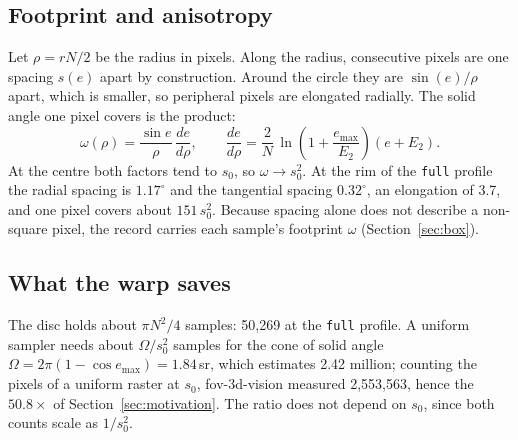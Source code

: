 \documentclass[11pt,a4paper]{article}
\newcommand{\code}[1]{\texttt{\small #1}}
\newcommand{\emax}{e_{\max}}
\begin{document}
\subsection{Footprint and anisotropy}\label{sec:footprint}

Let $\rho = rN/2$ be the radius in pixels. Along the radius, consecutive pixels are one spacing $s(e)$ apart by
construction. Around the circle they are $\sin(e)/\rho$ apart, which is smaller, so peripheral pixels are
elongated radially. The solid angle one pixel covers is the product:
\begin{equation}\label{eq:omega-fov}
\omega(\rho) = \frac{\sin e}{\rho}\,\frac{de}{d\rho}, \qquad
\frac{de}{d\rho} = \frac{2}{N}\,\ln\!\left(1+\frac{\emax}{E_2}\right)(e + E_2).
\end{equation}
At the centre both factors tend to $s_0$, so $\omega \to s_0^2$. At the rim of the \code{full} profile the radial
spacing is $1.17^\circ$ and the tangential spacing $0.32^\circ$, an elongation of 3.7, and one pixel covers about
$151\,s_0^2$. Because spacing alone does not describe a non-square pixel, the record carries each sample's
footprint $\omega$ (Section~\ref{sec:box}).

\subsection{What the warp saves}\label{sec:savings}

The disc holds about $\pi N^2/4$ samples: 50{,}269 at the \code{full} profile. A uniform sampler needs about
$\Omega/s_0^2$ samples for the cone of solid angle $\Omega = 2\pi(1 - \cos\emax) = 1.84$\,sr, which estimates
2.42 million; counting the pixels of a uniform raster at $s_0$, fov-3d-vision measured 2{,}553{,}563, hence the
$50.8\times$ of Section~\ref{sec:motivation}. The ratio does not depend on $s_0$, since both counts scale as
$1/s_0^2$.
\end{document}
